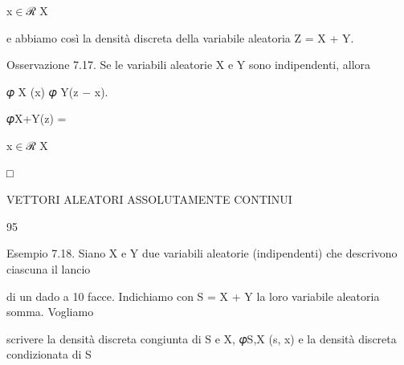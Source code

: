 \documentclass[a4paper,portrait,12pt]{article}
\begin{document}
\begin{flushleft}
x$\in$ℛ X
\end{flushleft}





\begin{flushleft}
e abbiamo così la densit\`{a} discreta della variabile aleatoria Z = X + Y.
\end{flushleft}


\begin{flushleft}
Osservazione 7.17. Se le variabili aleatorie X e Y sono indipendenti, allora
\end{flushleft}


\begin{flushleft}
𝜑 X (x) 𝜑 Y(z $-$ x).
\end{flushleft}





\begin{flushleft}
𝜑X+Y(z) =
\end{flushleft}


\begin{flushleft}
x$\in$ℛ X
\end{flushleft}





□





\begin{flushleft}
 VETTORI ALEATORI ASSOLUTAMENTE CONTINUI
\end{flushleft}





95





\begin{flushleft}
Esempio 7.18. Siano X e Y due variabili aleatorie (indipendenti) che descrivono ciascuna il lancio
\end{flushleft}


\begin{flushleft}
di un dado a 10 facce. Indichiamo con S = X + Y la loro variabile aleatoria somma. Vogliamo
\end{flushleft}


\begin{flushleft}
scrivere la densit\`{a} discreta congiunta di S e X, 𝜑S,X (s, x) e la densit\`{a} discreta condizionata di S
\end{flushleft}
\end{document}
